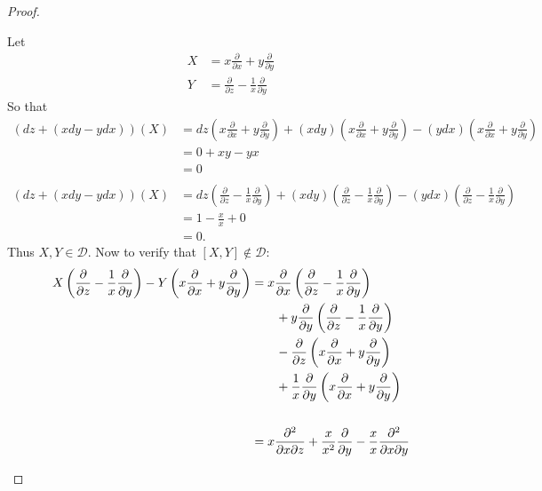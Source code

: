 \documentclass{article}
\begin{document}
\begin{proof}
\begin{enumerate}[(a)]
    Let \begin{align*}
      X &= x\frac{\partial}{\partial x} + y\frac{\partial}{\partial y} \\
      Y &= \frac{\partial}{\partial z} - \frac{1}{x}\frac{\partial}{\partial y}
    \end{align*}
    So that \begin{align*}
      (dz + (x dy - y dx))(X) &=
        dz(x\frac{\partial}{\partial x} + y\frac{\partial}{\partial y})
        + (x dy)(x\frac{\partial}{\partial x} + y\frac{\partial}{\partial y})
        - (y dx)(x\frac{\partial}{\partial x} + y\frac{\partial}{\partial y}) \\
        &= 0 + xy - yx \\
        &= 0 \\~\\
      (dz + (x dy - y dx))(X) &=
        dz(\frac{\partial}{\partial z} - \frac{1}{x}\frac{\partial}{\partial y})
        + (x dy)(\frac{\partial}{\partial z} - \frac{1}{x}\frac{\partial}{\partial y})
        - (y dx)(\frac{\partial}{\partial z} - \frac{1}{x}\frac{\partial}{\partial y}) \\
        &= 1 - \frac{x}{x} + 0 \\
        &= 0.
    \end{align*}
    Thus $X, Y \in \mathcal{D}$.
    Now to verify that $[X, Y] \not\in \mathcal{D}$: \begin{align*}
      X\left(\frac{\partial}{\partial z} - \frac{1}{x}\frac{\partial}{\partial y}\right)
      - Y\left(x\frac{\partial}{\partial x} + y\frac{\partial}{\partial y}\right)
      &= x\frac{\partial}{\partial x} \left(\frac{\partial}{\partial z} - \frac{1}{x}\frac{\partial}{\partial y}\right) \\
        &\hspace{0.7cm}+ y\frac{\partial}{\partial y} \left(\frac{\partial}{\partial z} - \frac{1}{x}\frac{\partial}{\partial y}\right)\\
        &\hspace{0.7cm}- \frac{\partial}{\partial z}\left(x\frac{\partial}{\partial x} + y\frac{\partial}{\partial y}\right) \\
        &\hspace{0.7cm}+ \frac{1}{x}\frac{\partial}{\partial y} \left(x\frac{\partial}{\partial x} + y\frac{\partial}{\partial y}\right)\\~\\
      &= x\frac{\partial^2}{\partial x\partial z}
          + \frac{x}{x^2}\frac{\partial}{\partial y}
          - \frac{x}{x}\frac{\partial^2}{\partial x \partial y} \\

\end{align*}
\end{enumerate}
\end{proof}
\end{document}
